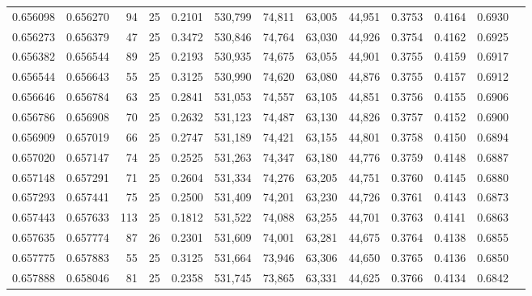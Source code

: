 \begin{tabular}{rrrrrrrrrrrrr}
0.656098 & 0.656270 &    94 &  25 &                                     0.2101 & 530,799 &  74,811 &  63,005 &  44,951 & 0.3753 & 0.4164 & 0.6930 \\
0.656273 & 0.656379 &    47 &  25 &                                     0.3472 & 530,846 &  74,764 &  63,030 &  44,926 & 0.3754 & 0.4162 & 0.6925 \\
0.656382 & 0.656544 &    89 &  25 &                                     0.2193 & 530,935 &  74,675 &  63,055 &  44,901 & 0.3755 & 0.4159 & 0.6917 \\
0.656544 & 0.656643 &    55 &  25 &                                     0.3125 & 530,990 &  74,620 &  63,080 &  44,876 & 0.3755 & 0.4157 & 0.6912 \\
0.656646 & 0.656784 &    63 &  25 &                                     0.2841 & 531,053 &  74,557 &  63,105 &  44,851 & 0.3756 & 0.4155 & 0.6906 \\
0.656786 & 0.656908 &    70 &  25 &                                     0.2632 & 531,123 &  74,487 &  63,130 &  44,826 & 0.3757 & 0.4152 & 0.6900 \\
0.656909 & 0.657019 &    66 &  25 &                                     0.2747 & 531,189 &  74,421 &  63,155 &  44,801 & 0.3758 & 0.4150 & 0.6894 \\
0.657020 & 0.657147 &    74 &  25 &                                     0.2525 & 531,263 &  74,347 &  63,180 &  44,776 & 0.3759 & 0.4148 & 0.6887 \\
0.657148 & 0.657291 &    71 &  25 &                                     0.2604 & 531,334 &  74,276 &  63,205 &  44,751 & 0.3760 & 0.4145 & 0.6880 \\
0.657293 & 0.657441 &    75 &  25 &                                     0.2500 & 531,409 &  74,201 &  63,230 &  44,726 & 0.3761 & 0.4143 & 0.6873 \\
0.657443 & 0.657633 &   113 &  25 &                                     0.1812 & 531,522 &  74,088 &  63,255 &  44,701 & 0.3763 & 0.4141 & 0.6863 \\
0.657635 & 0.657774 &    87 &  26 &                                     0.2301 & 531,609 &  74,001 &  63,281 &  44,675 & 0.3764 & 0.4138 & 0.6855 \\
0.657775 & 0.657883 &    55 &  25 &                                     0.3125 & 531,664 &  73,946 &  63,306 &  44,650 & 0.3765 & 0.4136 & 0.6850 \\
0.657888 & 0.658046 &    81 &  25 &                                     0.2358 & 531,745 &  73,865 &  63,331 &  44,625 & 0.3766 & 0.4134 & 0.6842 \\

\end{tabular}
